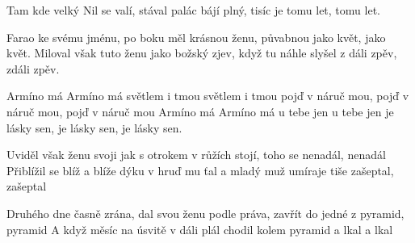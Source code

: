 
\beginverse{}
Tam kde velký Nil se valí,
stával palác bájí plný,
tisíc je tomu let, tomu let.
\endverse{}

\beginverse{}
Farao ke svému jménu,
po boku měl krásnou ženu,
půvabnou jako květ, jako květ.
Miloval však tuto ženu jako božský zjev,
když tu náhle slyšel z dáli zpěv, zdáli zpěv.
\endverse{}

\beginchorus{}
Armíno má Armíno má světlem i tmou světlem i tmou
pojď v náruč mou, pojď v náruč mou, pojď v náruč mou
Armíno má Armíno má u tebe jen u tebe jen
je lásky sen, je lásky sen, je lásky sen.
\endchorus{}

\beginverse{}
Uviděl však ženu svoji
jak s otrokem v růžích stojí,
toho se nenadál, nenadál
Přiblížil se blíž a blíže
dýku v hruď mu ťal
a mladý muž umíraje tiše zašeptal, zašeptal
\endverse{}

\beginchorus{}
\phantom{}
\endchorus{}

\beginverse{}
Druhého dne časně zrána,
dal svou ženu podle práva,
zavřít do jedné z pyramid, pyramid
A když měsíc na úsvitě v dáli plál
chodil kolem pyramid a lkal a lkal
\endverse{}

\beginchorus{}
\phantom{}
\endchorus{}

\endsong{}
